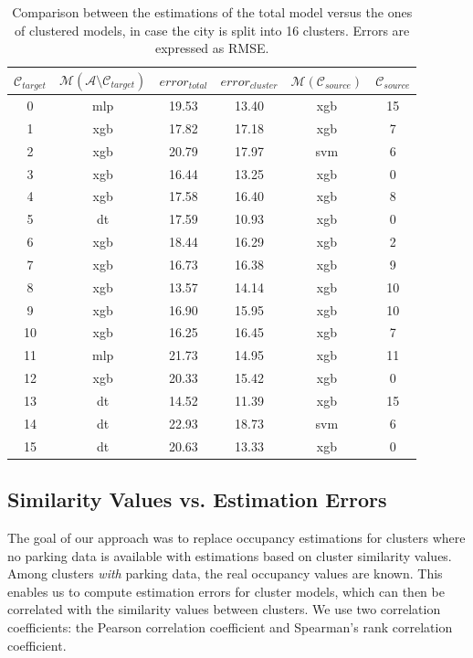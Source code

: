 \begin{table}[!ht]
	\centering
	\scriptsize
	\setlength\extrarowheight{5pt}
	\begin{tabular}{ | c | c | c | c | c | c |}
		\hline
		$\mathcal{C}_{target}$ & $\mathcal{M}(\mathcal{A} \setminus \mathcal{C}_{target})$ & $error_{total}$ & $error_{cluster}$ & $\mathcal{M}(\mathcal{C}_{source})$ & $\mathcal{C}_{source}$ \\ \hline
		0 & mlp & 19.53 & 13.40 & xgb &	15 \\ \hline
		1 & xgb & 17.82 & 17.18 & xgb &	7 \\ \hline
		2 &	xgb & 20.79 & 17.97 & svm &	6 \\ \hline
		3 & xgb & 16.44 & 13.25 & xgb &	0 \\ \hline
		4 & xgb & 17.58 & 16.40 & xgb & 8 \\ \hline
		5 & dt & 17.59 & 10.93 & xgb & 0 \\ \hline
		6 & xgb & 18.44 & 16.29 & xgb & 2 \\ \hline
		7 & xgb & 16.73 & 16.38 & xgb & 9 \\ \hline
		8 & xgb & 13.57 & 14.14 & xgb & 10 \\ \hline
		9 & xgb & 16.90 & 15.95 & xgb & 10 \\ \hline
		10 & xgb & 16.25 & 16.45 & xgb & 7 \\ \hline
		11 & mlp & 21.73 & 14.95 & xgb & 11 \\ \hline
		12 & xgb & 20.33 & 15.42 & xgb & 0 \\ \hline
		13 & dt & 14.52 & 11.39 & xgb & 15 \\ \hline
		14 & dt & 22.93 & 18.73 & svm & 6 \\ \hline
		15 & dt & 20.63 & 13.33 & xgb & 0 \\ \hline
	\end{tabular}
	\caption{Comparison between the estimations of the total model versus the ones of clustered models, in case the city is split into 16 clusters. Errors are expressed as RMSE.}
	\label{evaluation:cluster_vs_total_16c}
\end{table}

\subsection{Similarity Values vs. Estimation Errors}
\label{evaluation:similarity_vs_estimation_sec}
The goal of our approach was to replace occupancy estimations for clusters where no parking data is available with estimations based on cluster similarity values.
Among clusters \textit{with} parking data, the real occupancy values are known.
This enables us to compute estimation errors for cluster models, which can then be correlated with the similarity values between clusters.
We use two correlation coefficients: the Pearson correlation coefficient and Spearman's rank correlation coefficient.


